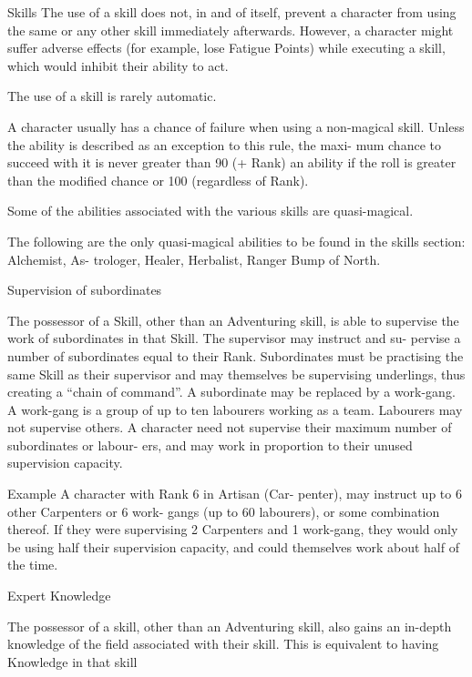 \begin{Chapter}{Skills}
The use of a skill does not, in and of itself, prevent 
a  character  from using  the  same  or  any  other  skill 
immediately  afterwards.  However,  a  character 
might  suffer  adverse  effects  (for  example,  lose 
Fatigue  Points)  while  executing  a  skill,  which 
would inhibit their ability to act. 

The use of a skill is rarely automatic. 

A  character  usually  has  a  chance  of  failure  when 
using  a  non-magical  skill.  Unless  the  ability  is 
described  as  an  exception  to  this  rule,  the  maxi-
mum  chance  to  succeed  with  it  is  never  greater 
than 90 (+ Rank)%
an  ability  if  the  roll  is  greater  than  the  modified 
chance or 100 (regardless of Rank). 

Some of the abilities associated with the various 
skills are quasi-magical. 

The  following  are  the  only  quasi-magical  abilities 
to  be  found  in  the  skills  section:  Alchemist,  As-
trologer, Healer, Herbalist, Ranger Bump of North. 

Supervision of subordinates 

The possessor of a Skill, other than an Adventuring 
skill, is able to supervise the work of subordinates 
in  that  Skill.  The  supervisor  may  instruct  and  su-
pervise  a  number  of  subordinates  equal  to  their 
Rank.  Subordinates  must  be  practising  the  same 
Skill  as  their  supervisor  and  may  themselves  be 
supervising  underlings,  thus  creating  a  “chain  of 
command”.  A  subordinate  may  be  replaced  by  a 
work-gang.  A  work-gang  is  a  group  of  up  to  ten 
labourers  working  as  a  team.  Labourers  may  not 
supervise  others.  A  character  need  not  supervise 
their  maximum number  of  subordinates  or  labour-
ers,  and  may  work  in  proportion  to  their  unused 
supervision capacity. 

Example  
A  character  with  Rank  6  in  Artisan  (Car-
penter),  may  instruct  up  to  6  other  Carpenters  or  6  work-
gangs  (up  to  60  labourers),  or  some  combination  thereof. 
If  they  were  supervising  2  Carpenters  and  1  work-gang, 
they  would  only  be  using  half  their  supervision  capacity, 
and could themselves work about half of the time. 

Expert Knowledge 

The possessor of a skill, other than an Adventuring 
skill, also gains an in-depth knowledge of the field 
associated  with  their  skill.  This  is  equivalent  to 
having Knowledge in that skill 


\end{Chapter}
